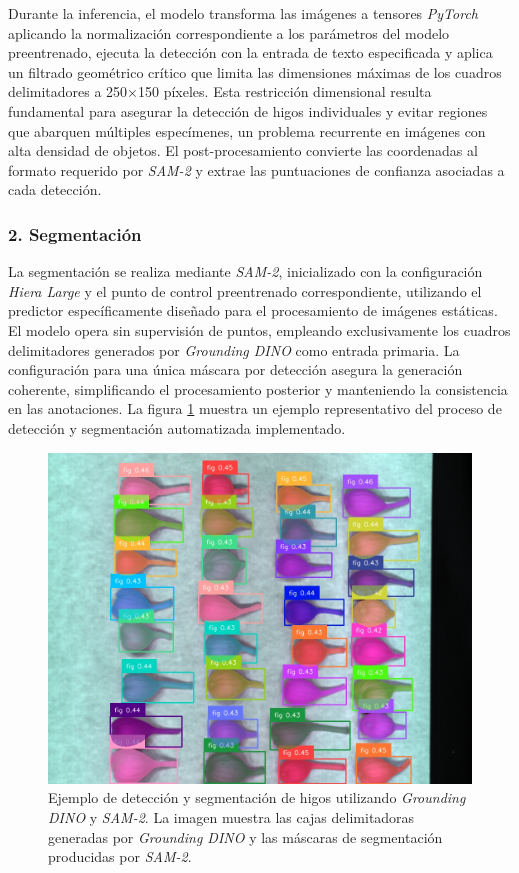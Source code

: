 \vspace{5mm}

Durante la inferencia, el modelo transforma las imágenes a tensores \emph{PyTorch} aplicando la normalización correspondiente a los parámetros del modelo preentrenado, ejecuta la detección con la entrada de texto especificada y aplica un filtrado geométrico crítico que limita las dimensiones máximas de los cuadros delimitadores a 250×150 píxeles. Esta restricción dimensional resulta fundamental para asegurar la detección de higos individuales y evitar regiones que abarquen múltiples especímenes, un problema recurrente en imágenes con alta densidad de objetos. El post-procesamiento convierte las coordenadas al formato requerido por \emph{SAM-2} y extrae las puntuaciones de confianza asociadas a cada detección.

\subsubsection{2. Segmentación}

La segmentación se realiza mediante \emph{SAM-2}, inicializado con la configuración \emph{Hiera Large} y el punto de control preentrenado correspondiente, utilizando el predictor específicamente diseñado para el procesamiento de imágenes estáticas. El modelo opera sin supervisión de puntos, empleando exclusivamente los cuadros delimitadores generados por \emph{Grounding DINO} como entrada primaria. La configuración para una única máscara por detección asegura la generación coherente, simplificando el procesamiento posterior y manteniendo la consistencia en las anotaciones. La figura \ref{fig:dino_sam} muestra un ejemplo representativo del proceso de detección y segmentación automatizada implementado.

\begin{figure}[ht]
\centering
\includegraphics[width=\textwidth]{images/dino_sam.jpg}
\caption{Ejemplo de detección y segmentación de higos utilizando \emph{Grounding DINO} y \emph{SAM-2}. La imagen muestra las cajas delimitadoras generadas por \emph{Grounding DINO} y las máscaras de segmentación producidas por \emph{SAM-2}.}
\label{fig:dino_sam}
\end{figure}

